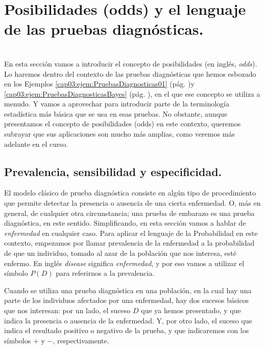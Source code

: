 \newpage
\section{Posibilidades (odds) y el lenguaje de las pruebas diagnósticas.}
\label{cap03:sec:OddsPruebasDiagnosticas}
\\

En esta sección vamos a introducir el concepto de {\sf posibilidades} (en inglés, {\em odds}). Lo haremos dentro del contexto de las pruebas diagnósticas que hemos esbozado en los Ejemplos \ref{cap03:ejem:PruebasDiagnosticas01} (pág. \pageref{cap03:ejem:PruebasDiagnosticas01})y \ref{cap03:ejem:PruebasDiagnosticasBayes} (pág. \pageref{cap03:ejem:PruebasDiagnosticasBayes}), en el que ese concepto se utiliza a menudo. Y vamos a aprovechar para introducir parte de la terminología estadística más básica que se usa en esas pruebas. No obstante, aunque presentamos el concepto de posibilidades (odds) en este contexto, queremos subrayar que sus aplicaciones son mucho más amplias, como veremos más adelante en el curso.

\subsection{Prevalencia, sensibilidad y especificidad.}
\label{cap03:subsec:PrevalenciaSensibilidad}

El modelo clásico de prueba diagnóstica consiste  en algún tipo de procedimiento que permite detectar la presencia o ausencia de una cierta enfermedad. O, más en general, de cualquier otra circunstancia; una prueba de embarazo es una prueba diagnóstica, en este sentido. Simplificando, en esta sección vamos a hablar de {\em enfermedad} en cualquier caso. Para aplicar el lenguaje de la Probabilidad en este contexto, empezamos por llamar {\sf prevalencia} de la enfermedad a la probabilidad de que un individuo, tomado al azar de la población que nos interesa, esté enfermo. En inglés {\em disease} significa {\em enfermedad}, y por eso vamos a utilizar el símbolo $P(D)$ para referirnos a la prevalencia.

Cuando se utiliza una prueba diagnóstica en una población, en la cual hay una parte de los individuos afectados por una enfermedad,  hay dos sucesos básicos que nos interesan: por un lado, el suceso $D$ que ya hemos presentado, y que indica la presencia o ausencia de la enfermedad. Y, por otro lado, el suceso que indica el resultado positivo o negativo de la prueba, y que indicaremos con los símbolos $+$ y $-$, respectivamente.

